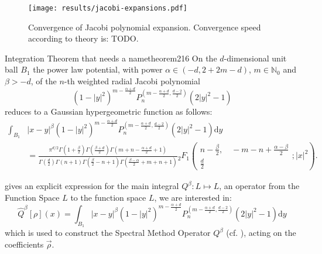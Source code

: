 \begin{figure}[H]
  \centering
  \label{fig:jacobi-expansions-error}
  \texttt{[image: results/jacobi-expansions.pdf]}
  \caption{Convergence of Jacobi polynomial expansion. Convergence speed according to theory is: TODO.}
\end{figure}







\begin{theorem}{Integration Theorem that needs a name}{theorem216}
  On the $d$-dimensional unit ball $B_1$ the power law potential, with power $\alpha \in(-d,2+2m-d)$, $m\in\mathbb{N}_0$ and $\beta>-d$, of the $n$-th weighted radial Jacobi polynomial $$(1-|y|^2)^{m-\frac{\alpha+d}{2}}P_n^{(m-\frac{\alpha+d}{2},\frac{d-2}{2})}(2|y|^2-1)$$ reduces to a Gaussian hypergeometric function as follows:
  \begin{align*}
    \int_{B_1} & |x-y|^\beta (1-|y|^2)^{m-\frac{\alpha+d}{2}} P_n^{(m-\frac{\alpha+d}{2},\frac{d-2}{2})}(2|y|^2-1) \mathrm{d}y                                                                                                                                                                                                                                                                                               \\
               & = \tfrac{\pi ^{d/2} \Gamma \left(1+\frac{\beta}{2}\right) \Gamma \left(\frac{\beta+d}{2}\right) \Gamma \left(m+n-\frac{\alpha+d}{2}+1\right)}{\Gamma \left(\frac{d}{2}\right) \Gamma (n+1) \Gamma \left(\frac{\beta}{2}-n+1\right) \Gamma \left(\frac{\beta-\alpha}{2}+m+n+1\right)}{}_2F_1\left(\begin{matrix}n-\frac{\beta}{2}, \quad -m-n+\frac{\alpha-\beta}{2} \\\frac{d}{2}\end{matrix};|x|^2\right).
  \end{align*}
\end{theorem}

 gives an explicit expression for the main integral
\(Q^{\beta}: L \mapsto L\), an operator from the Function Space \(L\) to the function space \(L\), we are interested in:
\[\hat{Q}^{\beta}[\rho](x) = \int_{B_1} |x-y|^\beta (1-|y|^2)^{m-\frac{\alpha+d}{2}} P_n^{(m-
  \frac{\alpha+d}{2},\frac{d-2}{2})}(2|y|^2-1) \mathrm{d}y\] which is used
to construct the Spectral Method Operator \(Q^\beta\) (cf. ), acting on the coefficients \(\vec{\rho}\).

